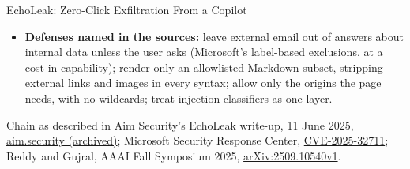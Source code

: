 \begin{frame}{EchoLeak: Zero-Click Exfiltration From a Copilot}
\begin{itemize}
    \item[\textcolor{red}{$\blacktriangleright$}] \textbf{Defenses named in the sources:} leave external email out of answers about internal data unless the user asks (Microsoft's label-based exclusions, at a cost in capability); render only an allowlisted Markdown subset, stripping external links and images in every syntax; allow only the origins the page needs, with no wildcards; treat injection classifiers as one layer.
  \end{itemize}
  \vspace{0.1em}
  {\scriptsize Chain as described in Aim Security's EchoLeak write-up, 11 June 2025, \href{https://web.archive.org/web/20250612074812/https://www.aim.security/lp/aim-labs-echoleak-blogpost}{aim.security (archived)}; Microsoft Security Response Center, \href{https://msrc.microsoft.com/update-guide/vulnerability/CVE-2025-32711}{CVE-2025-32711}; Reddy and Gujral, AAAI Fall Symposium 2025, \href{https://arxiv.org/abs/2509.10540v1}{arXiv:2509.10540v1}.}
\end{frame}
